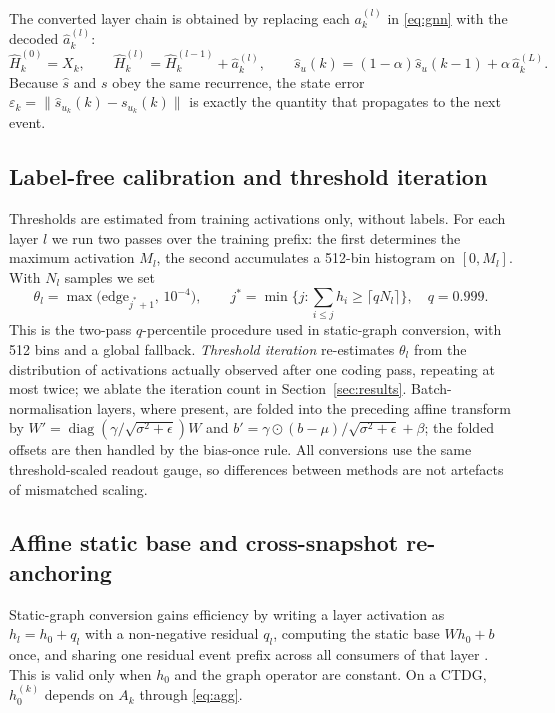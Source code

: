\documentclass[preprint,12pt]{elsarticle}
\begin{document}
The converted layer chain is obtained by replacing each $a^{(l)}_k$ in \eqref{eq:gnn} with the decoded $\hat a^{(l)}_k$:
\begin{equation}
\hat H^{(0)}_k=X_k,\qquad \hat H^{(l)}_k=\hat H^{(l-1)}_k+\hat a^{(l)}_k,\qquad
\hat s_u(k)=(1-\alpha)\hat s_u(k-1)+\alpha\,\hat a^{(L)}_k.
\label{eq:snn}
\end{equation}
Because $\hat s$ and $s$ obey the same recurrence, the state error $\varepsilon_k=\|\hat s_{u_k}(k)-s_{u_k}(k)\|$ is exactly the quantity that propagates to the next event.

\subsection{Label-free calibration and threshold iteration}
\label{sec:calib}

Thresholds are estimated from training activations only, without labels. For each layer $l$ we run two passes over the training prefix: the first determines the maximum activation $M_l$, the second accumulates a 512-bin histogram on $[0,M_l]$. With $N_l$ samples we set
\begin{equation}
\theta_l=\max\Big(\mathrm{edge}_{j^\ast+1},\,10^{-4}\Big),\qquad
j^\ast=\min\Big\{j:\sum_{i\le j}h_i\ge\lceil q N_l\rceil\Big\},\quad q=0.999 .
\label{eq:theta}
\end{equation}
This is the two-pass $q$-percentile procedure used in static-graph conversion, with 512 bins and a global fallback. \emph{Threshold iteration} re-estimates $\theta_l$ from the distribution of activations actually observed after one coding pass, repeating at most twice; we ablate the iteration count in Section~\ref{sec:results}. Batch-normalisation layers, where present, are folded into the preceding affine transform by $W'=\operatorname{diag}(\gamma/\sqrt{\sigma^2+\epsilon})W$ and $b'=\gamma\odot(b-\mu)/\sqrt{\sigma^2+\epsilon}+\beta$; the folded offsets are then handled by the bias-once rule. All conversions use the same threshold-scaled readout gauge, so differences between methods are not artefacts of mismatched scaling.

\subsection{Affine static base and cross-snapshot re-anchoring}
\label{sec:affine}

Static-graph conversion gains efficiency by writing a layer activation as $h_l=h_0+q_l$ with a non-negative residual $q_l$, computing the static base $Wh_0+b$ once, and sharing one residual event prefix across all consumers of that layer \cite{huang2025dcgs}. This is valid only when $h_0$ and the graph operator are constant. On a CTDG, $h_0^{(k)}$ depends on $A_k$ through \eqref{eq:agg}.
\end{document}
